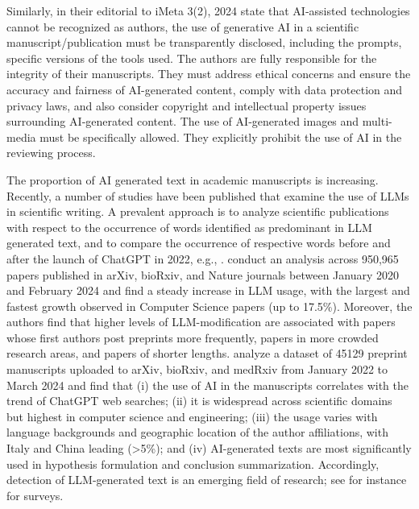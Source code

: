 Similarly, \citet{pu2024chatgpt} in their editorial to iMeta 3(2), 2024 state that AI‐assisted technologies cannot be recognized as authors, the use of generative AI in a scientific manuscript/publication must be transparently disclosed, including the prompts, specific versions of the tools used. The authors are fully responsible for the integrity of their manuscripts. They must address ethical concerns and ensure the accuracy and fairness of AI-generated content, comply with data protection and privacy laws, and also consider copyright and intellectual property issues surrounding AI‐generated content. The use of AI‐generated images and multi-media must be specifically allowed. They explicitly prohibit the use of AI in the reviewing process.

\iffalse
{}
The proportion of AI generated text in academic manuscripts is  increasing. Recently, a number of studies have been published that examine the use of LLMs in scientific writing. A prevalent approach is to analyze scientific publications with respect to the occurrence of words identified as predominant in LLM generated text, and to compare the occurrence of respective words before and after the launch of ChatGPT in 2022, e.g.,  \cite{gray2024chatgptcontaminationestimatingprevalence, kobak2024delving}.  \citet{liang2024mapping} conduct an analysis across 950,965 papers published in arXiv, bioRxiv, and Nature journals between January 2020 and February 2024 and find a steady increase in LLM usage, with the largest and fastest growth observed in Computer Science papers (up to 17.5\%). Moreover, the authors find that higher levels of LLM-modification are associated with papers whose first authors post preprints more frequently, papers in more crowded research areas, and papers of shorter lengths. \citet{cheng2024have} analyze a dataset of 45129 preprint manuscripts uploaded to arXiv, bioRxiv, and medRxiv from January 2022 to March 2024 and find that (i) the use of AI in the manuscripts  correlates with the trend of ChatGPT web searches; (ii) it is widespread across scientific domains but highest in computer science and engineering; (iii) the usage varies with language backgrounds and geographic location of the author affiliations, with Italy and China leading (>5\%); and (iv) AI-generated texts are most significantly used in hypothesis formulation and conclusion summarization.
Accordingly, detection of LLM-generated text is an emerging field of research; see for instance \cite{tang2024science, wu2025survey} for surveys.

